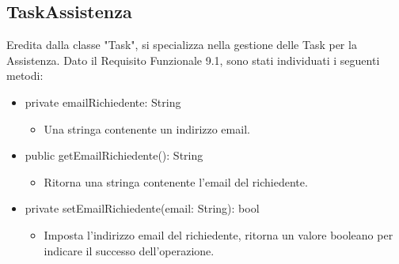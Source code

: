 \documentclass{report}
\begin{document}
\subsection*{TaskAssistenza}
Eredita dalla classe "Task", si specializza nella gestione delle Task per la Assistenza. Dato il Requisito Funzionale 9.1, sono stati individuati i seguenti metodi:
\begin{itemize}
\item private emailRichiedente: String
\begin{itemize}
	\item Una stringa contenente un indirizzo email.
\end{itemize}
\item public getEmailRichiedente(): String
\begin{itemize}
	\item Ritorna una stringa contenente l'email del richiedente.
\end{itemize}
\item private  setEmailRichiedente(email: String): bool
\begin{itemize}
	\item Imposta l'indirizzo email del richiedente, ritorna un valore booleano per indicare il successo dell'operazione.
\end{itemize}
\end{itemize}
\end{document}
